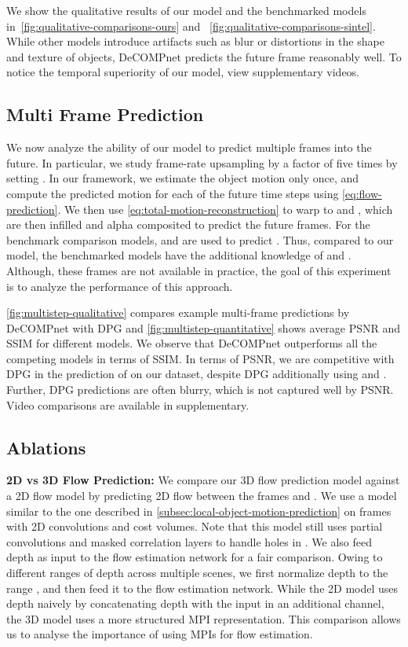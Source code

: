 \documentclass[preprint]{vgtc}
\begin{document}
    We show the qualitative results of our model and the benchmarked models in~\autoref{fig:qualitative-comparisons-ours} and ~\autoref{fig:qualitative-comparisons-sintel}.
    While other models introduce artifacts such as blur or distortions in the shape and texture of objects, DeCOMPnet predicts the future frame reasonably well.
To notice the temporal superiority of our model, view supplementary videos.



    \subsection{Multi Frame Prediction}\label{subsec:multi-frame-prediction}
    We now analyze the ability of our model to predict multiple frames into the future.
    In particular, we study frame-rate upsampling by a factor of five times by setting .
In our framework, we estimate the object motion  only once, and compute the predicted motion for each of the future time steps using \autoref{eq:flow-prediction}.
    We then use \autoref{eq:total-motion-reconstruction} to warp  to  and , which are then infilled and alpha composited to predict the future frames.
    For the benchmark comparison models,  and  are used to predict .
Thus, compared to our model, the benchmarked models have the additional knowledge of  and .
    Although, these frames are not available in practice, the goal of this experiment is to analyze the performance of this approach.


    \autoref{fig:multistep-qualitative} compares example multi-frame predictions by DeCOMPnet with DPG and \autoref{fig:multistep-quantitative} shows average PSNR and SSIM for different models.
    We observe that DeCOMPnet outperforms all the competing models in terms of SSIM.
    In terms of PSNR, we are competitive with DPG in the prediction of  on our dataset, despite DPG additionally using  and .
    Further, DPG predictions are often blurry, which is not captured well by PSNR.
Video comparisons are available in supplementary.

    \subsection{Ablations}\label{subsec:ablations}
    \textbf{2D vs 3D Flow Prediction:}
    We compare our 3D flow prediction model against a 2D flow model by predicting 2D flow between the frames  and .
    We use a model similar to the one described in \autoref{subsec:local-object-motion-prediction} on frames with 2D convolutions and cost volumes.
    Note that this model still uses partial convolutions and masked correlation layers to handle holes in .
    We also feed depth as input to the flow estimation network for a fair comparison.
    Owing to different ranges of depth across multiple scenes, we first normalize depth to the range , and then feed it to the flow estimation network.
    While the 2D model uses depth naively by concatenating depth with the input in an additional channel, the 3D model uses a more structured MPI representation.
    This comparison allows us to analyse the importance of using MPIs for flow estimation.
\end{document}
